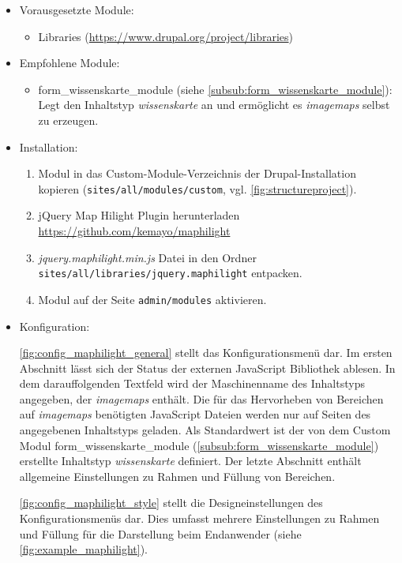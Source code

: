 \begin{itemize}[parsep=0pt, itemsep=5.0pt plus 2.0pt minus 1.0pt, leftmargin=*]
	\item Vorausgesetzte Module:

	\begin{itemize}
		\item Libraries (\url{https://www.drupal.org/project/libraries})
	\end{itemize}


	\item Empfohlene Module:

	\begin{itemize}
		\item form\_wissenskarte\_module (siehe \cref{subsub:form_wissenskarte_module}): Legt den Inhaltstyp \textit{wissenskarte} an und ermöglicht es \textit{\glspl{imagemap}} selbst zu erzeugen.
	\end{itemize}


	\item Installation:
	\begin{enumerate}
		\item Modul in das Custom-Module-Verzeichnis der Drupal-Installation kopieren  (\zB \lstinline|sites/all/modules/custom|, vgl. \cref{fig:structureproject}).
		\item jQuery Map Hilight Plugin herunterladen \url{https://github.com/kemayo/maphilight}
		\item \textit{jquery.maphilight.min.js} Datei in den Ordner \lstinline|sites/all/libraries/jquery.maphilight| entpacken.
		\item Modul auf der Seite \lstinline|admin/modules| aktivieren.
	\end{enumerate}

	\item Konfiguration:

	\cref{fig:config_maphilight_general} stellt das Konfigurationsmenü dar. Im ersten Abschnitt lässt sich der Status der externen JavaScript Bibliothek ablesen. In dem darauffolgenden Textfeld wird der Maschinenname des Inhaltstyps angegeben, der \textit{\glspl{imagemap}} enthält. Die für das Hervorheben von Bereichen auf \textit{\glspl{imagemap}} benötigten JavaScript Dateien werden nur auf Seiten des angegebenen Inhaltstyps geladen. Als Standardwert ist der von dem Custom Modul form\_wissenskarte\_module (\cref{subsub:form_wissenskarte_module}) erstellte Inhaltstyp \textit{wissenskarte} definiert. Der letzte Abschnitt enthält allgemeine Einstellungen zu Rahmen und Füllung von Bereichen.

	\cref{fig:config_maphilight_style} stellt die Designeinstellungen des Konfigurationsmenüs dar. Dies umfasst mehrere Einstellungen zu Rahmen und Füllung für die Darstellung beim Endanwender (siehe \cref{fig:example_maphilight}).

\end{itemize}



